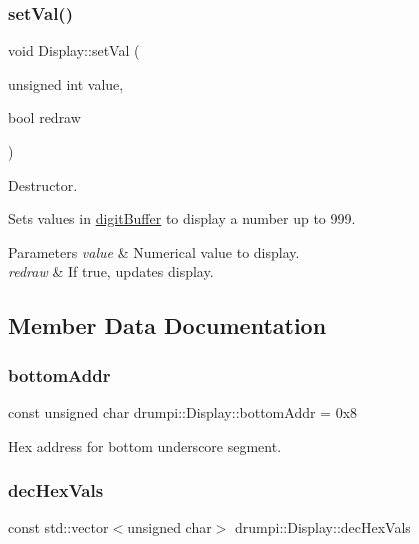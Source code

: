 \subsubsection{\texorpdfstring{set\+Val()}{setVal()}}
{\footnotesize\ttfamily void Display\+::set\+Val (\begin{DoxyParamCaption}\item[{unsigned int}]{value,  }\item[{bool}]{redraw }\end{DoxyParamCaption})}



Destructor. 

Sets values in \hyperlink{classdrumpi_1_1Max7219_ab26f32728dd82c00e39b6212436f291e}{digit\+Buffer} to display a number up to 999.


\begin{DoxyParams}{Parameters}
{\em value} & Numerical value to display. \\
\hline
{\em redraw} & If true, updates display. \\
\hline
\end{DoxyParams}


\subsection{Member Data Documentation}
\mbox{\label{classdrumpi_1_1Display_a071f2149fd9687d8b3c33fb92fe08fb1}} 
\subsubsection{\texorpdfstring{bottom\+Addr}{bottomAddr}}
{\footnotesize\ttfamily const unsigned char drumpi\+::\+Display\+::bottom\+Addr = 0x8\hspace{0.3cm}{\ttfamily [private]}}

Hex address for bottom underscore segment. \mbox{\label{classdrumpi_1_1Display_a6a545666c68e6fc74c386d47e1b86635}} 
\subsubsection{\texorpdfstring{dec\+Hex\+Vals}{decHexVals}}
{\footnotesize\ttfamily const std\+::vector$<$unsigned char$>$ drumpi\+::\+Display\+::dec\+Hex\+Vals\hspace{0.3cm}{\ttfamily [private]}}


